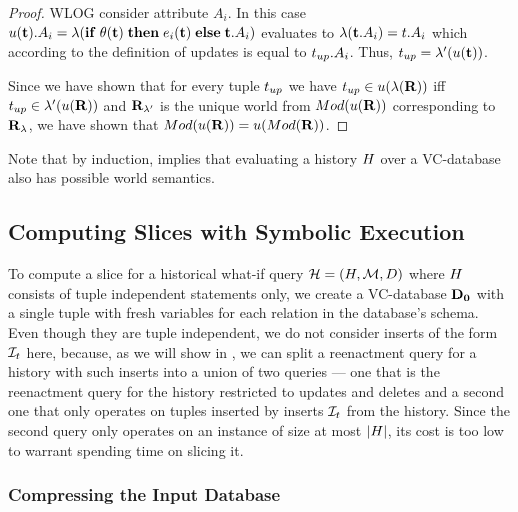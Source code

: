 {\begin{proof}
WLOG consider attribute $A_i$. In this case $u(\mathbf{t}).A_i = \lambda(\mathbf{if}\thickspace \theta(\mathbf{t}) \thickspace \mathbf{then} \thickspace e_i(\mathbf{t}) \thickspace \mathbf{else} \thickspace \mathbf{t}.A_i)$ evaluates to $\lambda(\mathbf{t}.A_i) = t.A_i$ which according to the definition of updates is equal to $t_{up}.A_i$. Thus, $t_{up} = \lambda'(u(\mathbf{t}))$.

Since we have shown that for every tuple $t_{up}$ we have $t_{up} \in u(\lambda(\mathbf{R}))$ iff $t_{up} \in \lambda'(u(\mathbf{R}))$ and $\mathbf{R}_{\lambda'}$ is the unique world from $Mod({u(\mathbf{R})})$ corresponding to $\mathbf{R}_{\lambda}$, we have shown that $Mod({u(\mathbf{R})}) = u(Mod({\mathbf{R}}))$.

\end{proof}
}

Note that by induction,  implies that evaluating a history $H$ over a  VC-database also has possible world semantics.



\subsection{Computing Slices with Symbolic Execution}\label{sec:symbolic-exe}

To compute a slice for a historical what-if query $\mathcal{H} = (H, \mathcal{M}, D)$  %
where $H$ consists of tuple independent statements only,
we create a VC-database $\mathbf{D_0}$ with a single tuple with fresh variables for each relation in the database's schema.
Even though they are tuple independent, we do not consider inserts of the form $\mathcal{I}_{t}$ here, because, as we will show in , we can split a reenactment query for a history with such inserts into a union of two queries --- one that is the reenactment query for the history restricted to updates and deletes and a second one that only operates on tuples inserted by inserts $\mathcal{I}_{t}$ from the history. Since the second query only operates on an instance of size at most $\left|{H}\right|$, its cost is too low to warrant spending time on slicing it.

\subsubsection{Compressing the Input Database}
\label{sec:compr-input-datab}

